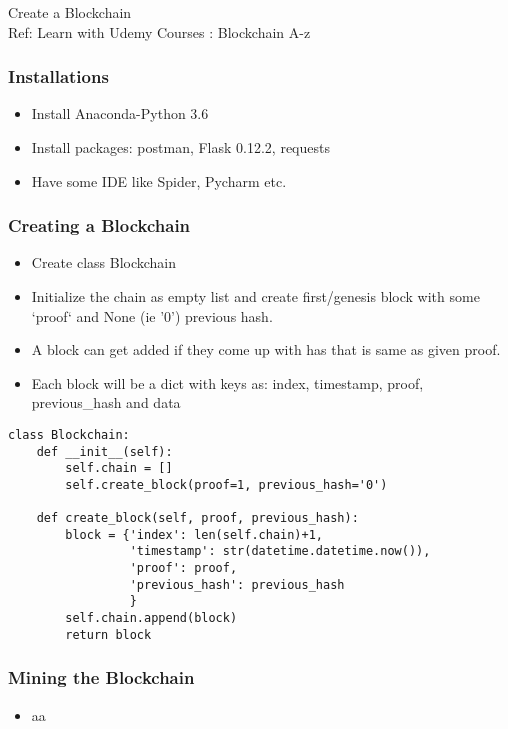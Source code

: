 \begin{frame}[fragile]\frametitle{}
\begin{center}
{\Large Create a Blockchain}\\
{\small Ref: Learn with Udemy Courses : Blockchain A-z}
\end{center}
\end{frame}

\begin{frame}[fragile]\frametitle{Installations}
\begin{itemize}
\item Install Anaconda-Python 3.6
\item Install packages: postman, Flask 0.12.2, requests
\item Have some IDE like Spider, Pycharm etc.
\end{itemize}
\end{frame}

\begin{frame}[fragile]\frametitle{Creating a Blockchain}
\begin{itemize}
\item Create class Blockchain
\item Initialize the chain as empty list and create first/genesis block with some `proof` and None (ie '0') previous hash.
\item A block can get added if they come up with has that is same as given proof.
\item Each block will be a dict with keys as: index, timestamp, proof, previous_hash and data
\end{itemize}

\begin{lstlisting}
class Blockchain:
    def __init__(self):
        self.chain = []
        self.create_block(proof=1, previous_hash='0')

    def create_block(self, proof, previous_hash):
        block = {'index': len(self.chain)+1,
                 'timestamp': str(datetime.datetime.now()),
                 'proof': proof,
                 'previous_hash': previous_hash
                 }
        self.chain.append(block)
        return block
\end{lstlisting}
\end{frame}


\begin{frame}[fragile]\frametitle{Mining the Blockchain}
\begin{itemize}
\item aa
\end{itemize}
\end{frame}